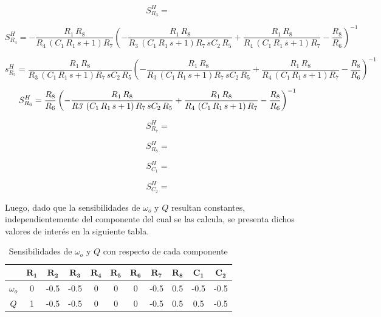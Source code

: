 \begin{equation}
S_{R_3}^{H} = 
\end{equation}

\begin{equation}
S_{R_4}^{H} = -{\frac {{R_1}\,{R_8}}{{R_4}\, \left( {C_1}\,{R_1}\,s+1
 \right) {R_7}} \left( -{\frac {{R_1}\,{R_8}}{{R_3}\,
 \left( {C_1}\,{R_1}\,s+1 \right) {R_7}\,s{C_2}\,{R_5}}
}+{\frac {{R_1}\,{R_8}}{{R_4}\, \left( {C_1}\,{R_1}\,s+
1 \right) {R_7}}}-{\frac {{R_8}}{{R_6}}} \right) ^{-1}}
\end{equation}

\begin{equation}
s_{R_5}^{H} ={\frac {{R_1}\,{R_8}}{{R_3}\, \left( {C_1}\,{R_1}\,s+1
 \right) {R_7}\,s{C_2}\,{R_5}} \left( -{\frac {{R_1}\,{
R_8}}{{R_3}\, \left( {C_1}\,{R_1}\,s+1 \right) {R_7}\,s
{C_2}\,{R_5}}}+{\frac {{R_1}\,{R_8}}{{R_4}\, \left( {
C_1}\,{R_1}\,s+1 \right) {R_7}}}-{\frac {{R_8}}{{R_6}}}
 \right) ^{-1}}
\end{equation}

\begin{equation}
S_{R_6}^{H} ={\frac {{R_8}}{{R_6}} \left( -{\frac {{R_1}\,{R_8}}{{\it 
R3}\, \left( {C_1}\,{R_1}\,s+1 \right) {R_7}\,s{C_2}\,{
R_5}}}+{\frac {{R_1}\,{R_8}}{{R_4}\, \left( {C_1}\,{
R_1}\,s+1 \right) {R_7}}}-{\frac {{R_8}}{{R_6}}} \right) ^
{-1}}
\end{equation}

\begin{equation}
S_{R_7}^{H} = 
\end{equation}

\begin{equation}
S_{R_8}^{H} = 
\end{equation}

\begin{equation}
S_{C_1}^{H} = 
\end{equation}

\begin{equation}
S_{C_2}^{H} = 
\end{equation}

Luego, dado que la sensibilidades de $\omega_o$ y $Q$ resultan constantes, independientemente del componente del cual se las calcula, se presenta dichos valores de interés en la siguiente tabla.
\begin{table}[H]
\centering
\begin{tabular}{ccccccccccc}
\hline
 & $\mathbf{R_1}$ & $\mathbf{R_2}$ & $\mathbf{R_3}$ & $\mathbf{R_4}$ & $\mathbf{R_5}$ & $\mathbf{R_6}$ & $\mathbf{R_7}$ & $\mathbf{R_8}$ & $\mathbf{C_1}$ & $\mathbf{C_2}$ \\
\hline
$\omega_o$ & 0 & -0.5 & -0.5 & 0 & 0 & 0 & -0.5 & 0.5 & -0.5 & -0.5 \\
$Q$ & 1 & -0.5 & -0.5 & 0 & 0 & 0 & -0.5 & 0.5 & 0.5 & -0.5	\\
\hline
\end{tabular}
\caption{Sensibilidades de $\omega_o$ y $Q$ con respecto de cada componente}
\end{table}


